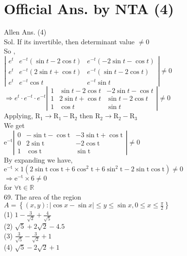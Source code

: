 \documentclass[10pt]{article}
\begin{document}
\section*{Official Ans. by NTA (4)}
Allen Ans. (4)\\
Sol. If its invertible, then determinant value \(\neq 0\)\\
So ,\\
\(\left|\begin{array}{ccc}e^{t} & e^{-t}(\sin t-2 \cos t) & e^{-t}(-2 \sin t-\cos t) \\ e^{t} & e^{-t}(2 \sin t+\cos t) & e^{-t}(\sin t-2 \cos t) \\ e^{t} & e^{-t} \cos t & e^{-t} \sin t\end{array}\right| \neq 0\)\\
\(\Rightarrow e^{t} \cdot e^{-t} \cdot e^{-t}\left|\begin{array}{ccc}1 & \sin t-2 \cos t & -2 \sin t-\cos t \\ 1 & 2 \sin t+\cos t & \sin t-2 \cos t \\ 1 & \cos t & \sin t\end{array}\right| \neq 0\)\\
Applying, \(\mathrm{R}_{1} \rightarrow \mathrm{R}_{1}-\mathrm{R}_{2}\) then \(\mathrm{R}_{2} \rightarrow \mathrm{R}_{2}-\mathrm{R}_{3}\)\\
We get\\
\(\mathrm{e}^{-\mathrm{t}}\left|\begin{array}{ccc}0 & -\sin \mathrm{t}-\cos \mathrm{t} & -3 \sin \mathrm{t}+\cos \mathrm{t} \\ 0 & 2 \sin \mathrm{t} & -2 \cos \mathrm{t} \\ 1 & \cos \mathrm{t} & \sin \mathrm{t}\end{array}\right| \neq 0\)\\
By expanding we have,\\
\(\mathrm{e}^{-\mathrm{t}} \times 1\left(2 \sin \mathrm{t} \cos \mathrm{t}+6 \cos ^{2} \mathrm{t}+6 \sin ^{2} \mathrm{t}-2 \sin \mathrm{t} \cos \mathrm{t}\right) \neq 0\)\\
\(\Rightarrow \mathrm{e}^{-\mathrm{t}} \times 6 \neq 0\)\\
for \(\forall \mathrm{t} \in \mathbb{R}\)\\
69. The area of the region\\
\(A=\left\{(x, y):|\cos x-\sin x| \leq y \leq \sin x, 0 \leq x \leq \frac{\pi}{2}\right\}\)\\
(1) \(1-\frac{3}{\sqrt{2}}+\frac{4}{\sqrt{5}}\)\\
(2) \(\sqrt{5}+2 \sqrt{2}-4.5\)\\
(3) \(\frac{3}{\sqrt{5}}-\frac{3}{\sqrt{2}}+1\)\\
(4) \(\sqrt{5}-2 \sqrt{2}+1\)
\end{document}
